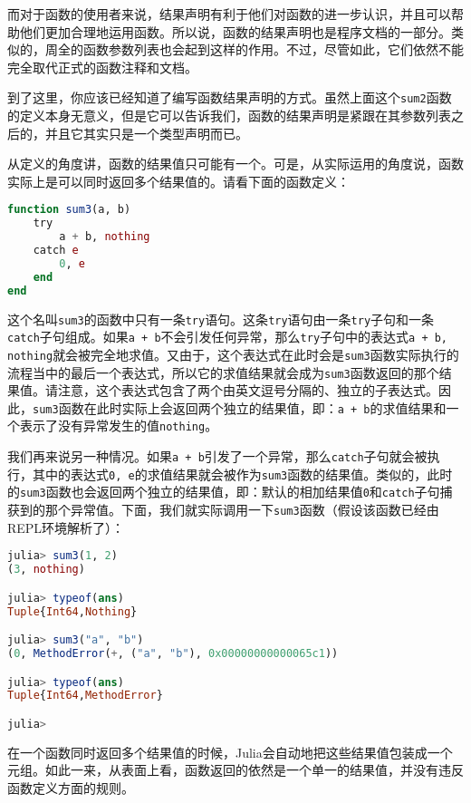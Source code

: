 而对于函数的使用者来说，结果声明有利于他们对函数的进一步认识，并且可以帮助他们更加合理地运用函数。所以说，函数的结果声明也是程序文档的一部分。类似的，周全的函数参数列表也会起到这样的作用。不过，尽管如此，它们依然不能完全取代正式的函数注释和文档。

到了这里，你应该已经知道了编写函数结果声明的方式。虽然上面这个\verb`sum2`函数的定义本身无意义，但是它可以告诉我们，函数的结果声明是紧跟在其参数列表之后的，并且它其实只是一个类型声明而已。

从定义的角度讲，函数的结果值只可能有一个。可是，从实际运用的角度说，函数实际上是可以同时返回多个结果值的。请看下面的函数定义：

\begin{lstlisting}[language=julia]
function sum3(a, b)
    try
        a + b, nothing
    catch e
        0, e
    end
end
\end{lstlisting}

这个名叫\verb`sum3`的函数中只有一条\verb`try`语句。这条\verb`try`语句由一条\verb`try`子句和一条\verb`catch`子句组成。如果\verb`a + b`不会引发任何异常，那么\verb`try`子句中的表达式\verb`a + b, nothing`就会被完全地求值。又由于，这个表达式在此时会是\verb`sum3`函数实际执行的流程当中的最后一个表达式，所以它的求值结果就会成为\verb`sum3`函数返回的那个结果值。请注意，这个表达式包含了两个由英文逗号分隔的、独立的子表达式。因此，\verb`sum3`函数在此时实际上会返回两个独立的结果值，即：\verb`a + b`的求值结果和一个表示了没有异常发生的值\verb`nothing`。

我们再来说另一种情况。如果\verb`a + b`引发了一个异常，那么\verb`catch`子句就会被执行，其中的表达式\verb`0, e`的求值结果就会被作为\verb`sum3`函数的结果值。类似的，此时的\verb`sum3`函数也会返回两个独立的结果值，即：默认的相加结果值\verb`0`和\verb`catch`子句捕获到的那个异常值。下面，我们就实际调用一下\verb`sum3`函数（假设该函数已经由REPL环境解析了）：

\begin{lstlisting}[language=julia]
julia> sum3(1, 2)
(3, nothing)

julia> typeof(ans)
Tuple{Int64,Nothing}

julia> sum3("a", "b")
(0, MethodError(+, ("a", "b"), 0x00000000000065c1))

julia> typeof(ans)
Tuple{Int64,MethodError}

julia> 
\end{lstlisting}

在一个函数同时返回多个结果值的时候，Julia会自动地把这些结果值包装成一个元组。如此一来，从表面上看，函数返回的依然是一个单一的结果值，并没有违反函数定义方面的规则。

